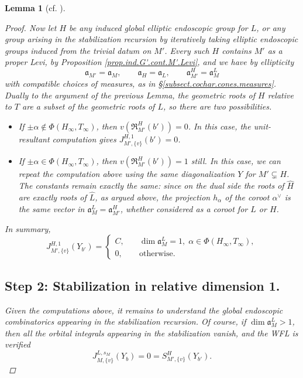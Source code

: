 \documentclass[openany]{amsbook}
\newtheorem{lemma}[theorem]{Lemma}
\theoremstyle{definition}
\theoremstyle{remark}
\numberwithin{equation}{section}
\renewcommand{\-}{\operatorname{-}}
\renewcommand{\a}{\mathfrak{a}}
\newcommand{\fR}{\mathfrak{R}}
\begin{document}
\begin{lemma}[{cf. \cite[Lemme 17.6.2, Lemme 17.8.1]{CLII}}]
\begin{proof}
        Now let $H$ be any induced global elliptic endoscopic group for $L$, or any group arising in the stabilization recursion by iteratively taking elliptic endoscopic groups induced from the trivial datum on $M'$. Every such $H$ contains $M'$ as a proper Levi, by Proposition \ref{prop.ind.G'.cont.M'.Levi}, and we have by ellipticity
        $$
            \a_{M'} = \a_M, \qquad \a_H = \a_L, \qquad \a_{M'}^H = \a_M^L
        $$
        with compatible choices of measures, as in \S \ref{subsect.cochar.cones.measures}. Dually to the argument of the previous Lemma, the geometric roots of $H$ relative to $T$ are a subset of the geometric roots of $L$, so there are two possibilities.
        \begin{itemize}
            \item If $\pm \alpha \not\in \Phi(H_\infty, T_\infty)$, then $v(\fR_{M'}^H(b')) = 0$. In this case, the unit-resultant computation gives $J_{M',\{v\}}^{H,1}(b') = 0$. 
            \item If $\pm \alpha \in \Phi(H_\infty, T_\infty)$, then $v(\fR_{M'}^H(b')) = 1$ still. In this case, we can repeat the computation above using the same diagonalization $Y$ for $M' \subsetneq H$. The constants remain exactly the same: since on the dual side the roots of $\widehat{H}$ are exactly roots of $\widehat{L}$, as argued above, the projection $h_\alpha$ of the coroot $\alpha^\vee$ is the \emph{same} vector in $\a_M^L = \a_{M'}^H$, whether considered as a coroot for $L$ or $H$. 
        \end{itemize}
        In summary,
        $$
            J_{M', \{v\}}^{H,1}(Y_{b'}) = \begin{cases} C, \quad & \dim \a_M^L = 1, \; \alpha \in \Phi(H_\infty, T_\infty),\\
            0, & \text{otherwise.}
            \end{cases}
        $$
        

        \subsection{Step 2: Stabilization in relative dimension 1.}
        Given the computations above, it remains to understand the global endoscopic combinatorics appearing in the stabilization recursion. Of course, if $\dim \a_M^L > 1$, then all the orbital integrals appearing in the stabilization vanish, and the WFL is verified
        $$
            J_{M,\{v\}}^{L, s_M}(Y_b) = 0 = S_{M',\{v\}}^{H}(Y_{b'}).
        $$


\end{proof}
\end{lemma}
\end{document}
